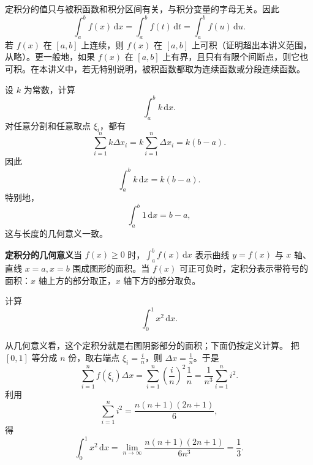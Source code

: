 \documentclass[fontset=fandol]{ctexart}
\newcommand{\dd}{\mathrm{d}}
\begin{document}
定积分的值只与被积函数和积分区间有关，与积分变量的字母无关。因此
\[
\int_a^b f(x)\,\dd x=\int_a^b f(t)\,\dd t=\int_a^b f(u)\,\dd u.
\]
若 $f(x)$ 在 $[a,b]$ 上连续，则 $f(x)$ 在 $[a,b]$ 上可积（证明超出本讲义范围，从略）。更一般地，如果 $f(x)$ 在 $[a,b]$ 上有界，且只有有限个间断点，则它也可积。在本讲义中，若无特别说明，被积函数都取为连续函数或分段连续函数。


\begin{example}[用定义计算常数函数]
设 $k$ 为常数，计算
\[
\int_a^b k\,\dd x.
\]
对任意分割和任意取点 $\xi_i$，都有
\[
\sum_{i=1}^n k\Delta x_i
=k\sum_{i=1}^n \Delta x_i
=k(b-a).
\]
因此
\[
\int_a^b k\,\dd x=k(b-a).
\]
特别地，
\[
\int_a^b 1\,\dd x=b-a,
\]
这与长度的几何意义一致。
\end{example}

\noindent\textbf{定积分的几何意义}\quad 当 $f(x)\geq0$ 时，$\int_a^b f(x)\,\dd x$ 表示曲线 $y=f(x)$ 与 $x$ 轴、直线 $x=a,x=b$ 围成图形的面积。当 $f(x)$ 可正可负时，定积分表示带符号的面积：$x$ 轴上方的部分取正，$x$ 轴下方的部分取负。

\begin{example}[用定义计算]
计算
\[
\int_0^1 x^2\,\dd x.
\]
\begin{figure}
\vspace{-1.2em}
\centering
{}
\vspace{-1.2em}
\end{figure}
从几何意义看，这个定积分就是右图阴影部分的面积；下面仍按定义计算。
把 $[0,1]$ 等分成 $n$ 份，取右端点 $\xi_i=\frac{i}{n}$，则 $\Delta x=\frac1n$。于是
\[
\sum_{i=1}^n f(\xi_i)\Delta x
=\sum_{i=1}^n \left(\frac{i}{n}\right)^2\frac1n
=\frac1{n^3}\sum_{i=1}^n i^2.
\]
利用
\[
\sum_{i=1}^n i^2=\frac{n(n+1)(2n+1)}6,
\]
得
\[
\int_0^1 x^2\,\dd x
=\lim_{n\to\infty}\frac{n(n+1)(2n+1)}{6n^3}
=\frac13.
\]
\end{example}
\end{document}
